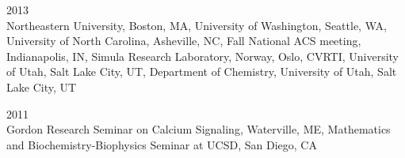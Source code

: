 \hfill 2013 \\
Northeastern University, Boston, MA, 
University of Washington, Seattle, WA, 
University of North Carolina, Asheville, NC,
Fall National ACS meeting, Indianapolis, IN, 
Simula Research Laboratory, Norway, Oslo, 
CVRTI, University of Utah, Salt Lake City, UT, Department of Chemistry, University of Utah, Salt Lake City, UT

\hfill 2011 \\
Gordon Research Seminar on Calcium Signaling, Waterville, ME, 
Mathematics and Biochemistry-Biophysics Seminar at UCSD, San Diego, CA 
